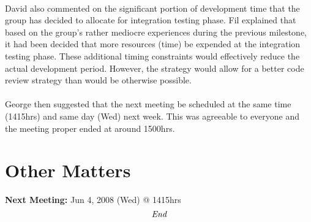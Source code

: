 \documentclass[10pt, a4]{article}
\begin{document}
\paragraph{} David also commented on the significant portion of development 
time that the group has decided to allocate for integration testing phase. 
Fil explained that based on the group's rather mediocre experiences during 
the previous milestone, it had been decided that more resources (time) be 
expended at the integration testing phase. These additional timing constraints
would effectively reduce the actual development period. However, the strategy
would allow for a better code review strategy than would be otherwise possible.

\paragraph{} George then suggested that the next meeting be scheduled at the 
same time (1415hrs) and same day (Wed) next week. This was agreeable 
to everyone and the meeting proper ended at around 1500hrs.


\section{Other Matters}

\textbf{Next Meeting:} Jun 4, 2008 (Wed) @ 1415hrs\\

\[\emph{End}\]
 
\end{document}
